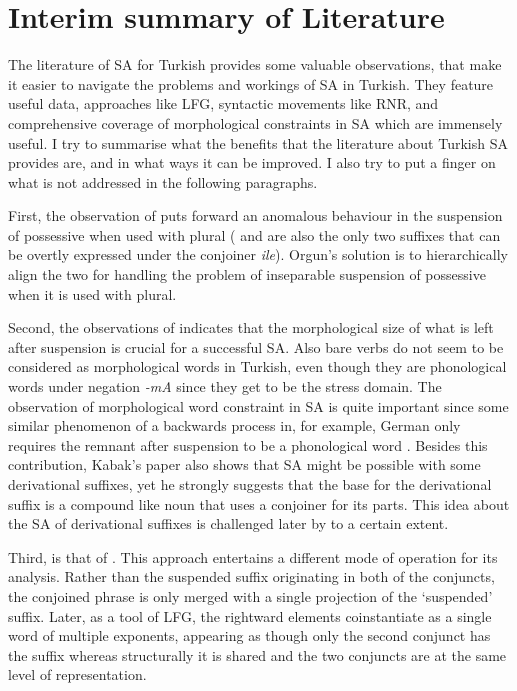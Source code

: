 \section{Interim summary of Literature}

The literature of SA for Turkish provides some valuable observations, that make it easier to navigate the problems and workings of SA in Turkish. They feature useful data, approaches like LFG, syntactic movements like RNR, and comprehensive coverage of morphological constraints in SA which are immensely useful. I try to summarise what the benefits that the literature about Turkish SA provides are, and in what ways it can be improved. I also try to put a finger on what is not addressed in the following paragraphs.  

First, the observation of \cite{orgun1995flat} puts forward an anomalous behaviour in the suspension of possessive when used with plural ({\Pl} and {\Poss} are also the only two suffixes that can be overtly expressed under the conjoiner \textit{ile}). Orgun's solution is to hierarchically align the two for handling the problem of inseparable suspension of possessive when it is used with plural.

Second, the observations of \cite{kabak2007turkish} indicates that the morphological size of what is left after suspension is crucial for a successful SA. Also bare verbs do not seem to be considered as morphological words in Turkish, even though they are phonological words under negation \textit{-mA} since they get to be the stress domain. The observation of morphological word constraint in SA is quite important since some similar phenomenon of a backwards process in, for example, German only requires the remnant after suspension to be a phonological word \citep{smith2000word, pounder2006broken,kenesei2007semiwords}. Besides this contribution, Kabak's paper also shows that SA might be possible with some derivational suffixes, yet he strongly suggests that the base for the derivational suffix is a compound like noun that uses a conjoiner for its parts. This idea about the SA of derivational suffixes is challenged later by \cite{akkucs2016suspended} to a certain extent.

Third, is that of \cite{broadwell2008turkish}. This approach entertains a different mode of operation for its analysis. Rather than the suspended suffix originating in both of the conjuncts, the conjoined phrase is only merged with a single projection of the `suspended' suffix. Later, as a tool of LFG, the rightward elements coinstantiate as a single word of multiple exponents, appearing as though only the second conjunct has the suffix whereas structurally it is shared and the two conjuncts are at the same level of representation.

